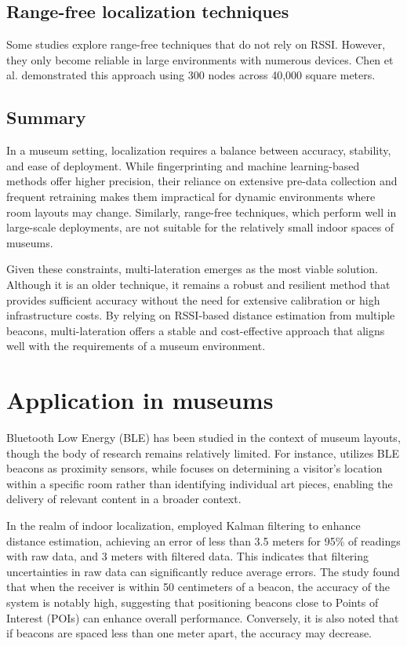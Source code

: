 \subsection{Range-free localization techniques}

Some studies explore range-free techniques that do not rely on RSSI. However, they only become reliable in large environments with numerous devices. Chen et al. \cite{chen_range-free_2013} demonstrated this approach using 300 nodes across 40,000 square meters.  

\subsection{Summary}

In a museum setting, localization requires a balance between accuracy, stability, and ease of deployment. While fingerprinting and machine learning-based methods offer higher precision, their reliance on extensive pre-data collection and frequent retraining makes them impractical for dynamic environments where room layouts may change. Similarly, range-free techniques, which perform well in large-scale deployments, are not suitable for the relatively small indoor spaces of museums.  

Given these constraints, multi-lateration emerges as the most viable solution. Although it is an older technique, it remains a robust and resilient method that provides sufficient accuracy without the need for extensive calibration or high infrastructure costs. By relying on RSSI-based distance estimation from multiple beacons, multi-lateration offers a stable and cost-effective approach that aligns well with the requirements of a museum environment.

\section{Application in museums}

Bluetooth Low Energy (BLE) has been studied in the context of museum layouts, though the body of research remains relatively limited. For instance, \cite{barsocchi_detecting_2021} utilizes BLE beacons as proximity sensors, while \cite{verde_indoor_2023} focuses on determining a visitor's location within a specific room rather than identifying individual art pieces, enabling the delivery of relevant content in a broader context. 

In the realm of indoor localization, \cite{spachos_ble_2020} employed Kalman filtering to enhance distance estimation, achieving an error of less than 3.5 meters for 95\% of readings with raw data, and 3 meters with filtered data. This indicates that filtering uncertainties in raw data can significantly reduce average errors. The study found that when the receiver is within 50 centimeters of a beacon, the accuracy of the system is notably high, suggesting that positioning beacons close to Points of Interest (POIs) can enhance overall performance. Conversely, it is also noted that if beacons are spaced less than one meter apart, the accuracy may decrease.
